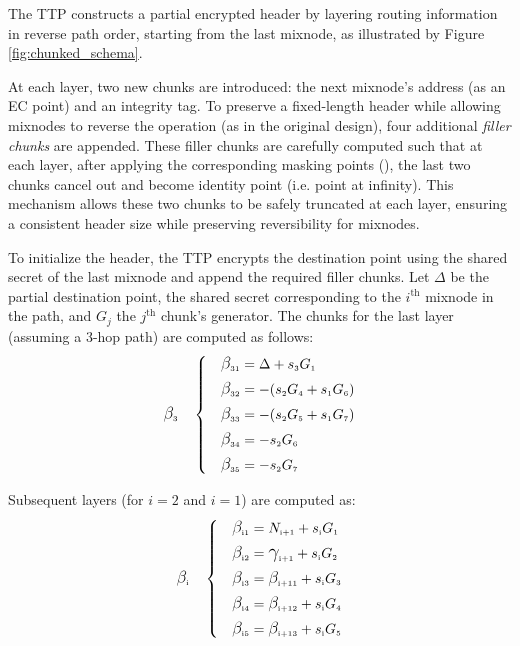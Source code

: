 The TTP constructs a partial encrypted header by layering routing information in reverse path order, starting from the last mixnode, as illustrated by Figure \ref{fig:chunked_schema}.

At each layer, two new chunks are introduced: the next mixnode’s address (as an EC point) and an integrity tag.  
To preserve a fixed-length header while allowing mixnodes to reverse the operation (as in the original design), four additional \emph{filler chunks} are appended.  
These filler chunks are carefully computed such that at each layer, after applying the corresponding masking points (), the last two chunks cancel out and become identity point (i.e. point at infinity).  
This mechanism allows these two chunks to be safely truncated at each layer, ensuring a consistent header size while preserving reversibility for mixnodes.

To initialize the header, the TTP encrypts the destination point using the shared secret of the last mixnode and append the required filler chunks. 
Let $ \Delta $ be the partial destination point,  the shared secret corresponding to the $ i^\text{th} $ mixnode in the path, and $ G_j $ the $ j^\text{th} $ chunk's generator. 
The chunks for the last layer (assuming a 3-hop path) are computed as follows:
\begin{equation}
\B{3}{} \quad \left\{ \quad
\begin{aligned}
    \B{3}{1} &= \Delta       + \sG{3}{1} \\
    \B{3}{2} &= - (\sG{2}{4} + \sG{1}{6}) \\
    \B{3}{3} &= - (\sG{2}{5} + \sG{1}{7}) \\
    \B{3}{4} &= - \sG{2}{6} \\
    \B{3}{5} &= - \sG{2}{7} \\
\end{aligned}
\right.
\label{eq:last_layer}
\end{equation}

\noindent
Subsequent layers (for $ i = 2 $ and $ i = 1 $) are computed as:
\begin{equation}
\B{i}{} \quad \left\{ \quad
\begin{aligned}
    \B{i}{1} &= \N{i+1} + \sG{i}{1}\\
    \B{i}{2} &= \C{i+1} + \sG{i}{2} \\
    \B{i}{3} &= \B{i+1}{1} + \sG{i}{3} \\
    \B{i}{4} &= \B{i+1}{2} + \sG{i}{4} \\
    \B{i}{5} &= \B{i+1}{3} + \sG{i}{5} \\
\end{aligned}
\right.
\label{eq:layer_i}
\end{equation}

